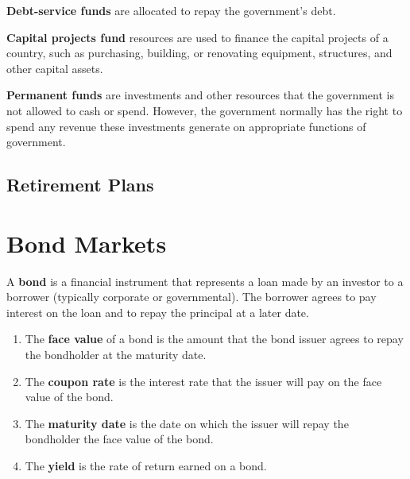 \documentclass{article}
\begin{document}
      \begin{definition}
      \textbf{Debt-service funds} are allocated to repay the government's debt. 
      \end{definition}

      \begin{definition}
      \textbf{Capital projects fund} resources are used to finance the capital projects of a country, such as purchasing, building, or renovating equipment, structures, and other capital assets. 
      \end{definition}

      \begin{definition}
      \textbf{Permanent funds} are investments and other resources that the government is not allowed to cash or spend. However, the government normally has the right to spend any revenue these investments generate on appropriate functions of government.
      \end{definition}

  \subsection{Retirement Plans}

\section{Bond Markets}

    \begin{definition}[Bond]
      A \textbf{bond} is a financial instrument that represents a loan made by an investor to a borrower (typically corporate or governmental). The borrower agrees to pay interest on the loan and to repay the principal at a later date. 
      \begin{enumerate}
        \item The \textbf{face value} of a bond is the amount that the bond issuer agrees to repay the bondholder at the maturity date. 
        \item The \textbf{coupon rate} is the interest rate that the issuer will pay on the face value of the bond. 
        \item The \textbf{maturity date} is the date on which the issuer will repay the bondholder the face value of the bond. 
        \item The \textbf{yield} is the rate of return earned on a bond. 
      \end{enumerate}
    \end{definition}
\end{document}
